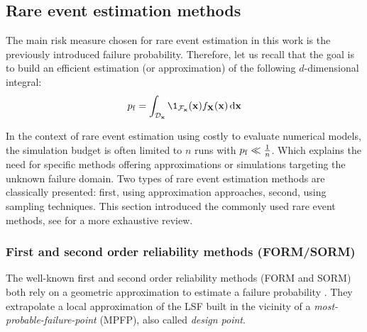 \subsection{Rare event estimation methods} 

The main risk measure chosen for rare event estimation in this work is the previously introduced failure probability. 
Therefore, let us recall that the goal is to build an efficient estimation (or approximation) of the following $d$-dimensional integral: 
\begin{equation}
    \pf = \int_{\iD_\bx} \1_{\iF_\bx}(\bx) f_\bX(\bx) \, \dd\bx
\end{equation}

In the context of rare event estimation using costly to evaluate numerical models, the simulation budget is often limited to $n$ runs with $p_\mathrm{f} \ll \frac1n$. 
Which explains the need for specific methods offering approximations or simulations targeting the unknown failure domain. 
Two types of rare event estimation methods are classically presented: first, using approximation approaches, second, using sampling techniques. 
This section introduced the commonly used rare event methods, see \cite{MorioBalesdent2015} for a more exhaustive review.


\subsubsection{First and second order reliability methods (FORM/SORM)}

The well-known first and second order reliability methods (FORM and SORM) both rely on a geometric approximation to estimate a failure probability \citep{lemaire_2013}. 
They extrapolate a local approximation of the LSF built in the vicinity of a \textit{most-probable-failure-point} (MPFP), also called \textit{design point}.

